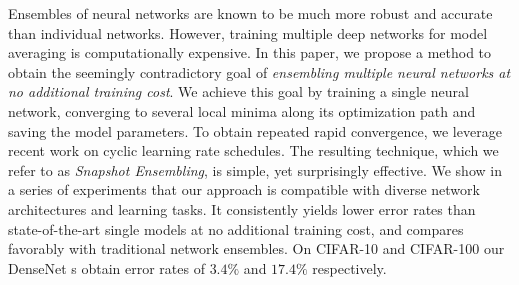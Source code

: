 Ensembles of neural networks are known to be much more robust and accurate than individual networks. However, training multiple deep networks for model averaging is computationally expensive. In this paper, we propose a method to obtain the seemingly contradictory goal of \emph{ensembling multiple neural networks at no additional training cost}.
We achieve this goal by training a single neural network, converging to several local minima along its optimization path and saving the model parameters.  To obtain repeated rapid convergence, we leverage recent work on cyclic learning rate schedules.
The resulting technique, which we refer to as \emph{Snapshot Ensembling}, is simple, yet surprisingly effective.  We show in a series of experiments that our approach is compatible with diverse network architectures and learning tasks. It consistently yields  lower error rates than state-of-the-art single models at no additional training cost, and compares favorably with traditional network ensembles. On CIFAR-10 and CIFAR-100 our DenseNet \name{}s obtain error rates of $3.4\%$ and $17.4\%$ respectively.

%
